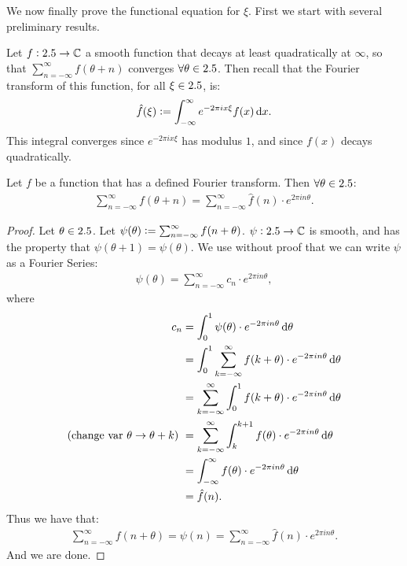 \setcounter{section}{0}
\setcounter{theorem}{0}



We now finally prove the functional equation for $\xi$. First we start with several preliminary results.

Let $f: 2.5 \to \mathbb{C}$ a smooth function that decays at least quadratically at $\infty$, so that $\sum_{n=-\infty}^{\infty} f(\theta+n)$ converges $\forall \theta \in 2.5$. Then recall that the Fourier transform of this function, for all $\xi \in 2.5$, is:
\begin{align*}
    \hat{f}(\xi) \defas \int_{-\infty}^\infty e^{-2 \pi i x \xi} f(x) \dif x.
\end{align*}
This integral converges since $e^{-2 \pi i x \xi}$ has modulus $1$, and since $f(x)$ decays quadratically.

\begin{proposition}\label{prop:poisson-sum}
Let $f$ be a function that has a defined Fourier transform. Then $\forall \theta \in 2.5$:
\begin{align*}
    \sum_{n=-\infty}^\infty f(\theta + n) = \sum_{n=-\infty}^\infty \hat{f}(n) \cdot e^{2 \pi i n \theta}.
\end{align*}
\end{proposition}
\begin{proof}
Let $\theta \in 2.5$. Let $\psi(\theta) \vcentcolon = \sum_{n=-\infty}^{\infty} f(n+\theta)$. $\psi : 2.5 \to \mathbb{C}$ is smooth, and has the property that $\psi(\theta+1) = \psi(\theta) $. We use without proof that we can write $\psi$ as a Fourier Series:
\begin{align*}
    \psi(\theta) = \sum_{n=-\infty}^{\infty} c_n \cdot e^{2 \pi i n \theta},
\end{align*}
where
\begin{align*}
    c_n &= \int_0^1 \psi(\theta) \cdot e^{-2 \pi i n \theta} \dif \theta \\ &= \int_0^1 \sum_{k=-\infty}^{\infty} f(k+\theta) \cdot e^{-2 \pi i n \theta} \dif \theta \\&=  \sum_{k=-\infty}^{\infty} \int_0^1 f(k+\theta) \cdot e^{-2 \pi i n \theta} \dif \theta \\ \text{(change var $\theta \to \theta +k$) } &= \sum_{k=-\infty}^{\infty} \int_k^{k+1} f(\theta) \cdot e^{-2 \pi i n \theta} \dif \theta \\
    &= \int_{-\infty}^{\infty} f(\theta) \cdot e^{-2 \pi i n \theta} \dif \theta \\&= \hat{f}(n).
\end{align*}
Thus we have that:
\begin{align*}
    \sum_{n=-\infty}^{\infty} f(n+\theta) = \psi(n) = \sum_{n=-\infty}^{\infty} \hat{f}(n) \cdot e^{2 \pi i n \theta}.
\end{align*}
And we are done.
\end{proof}

